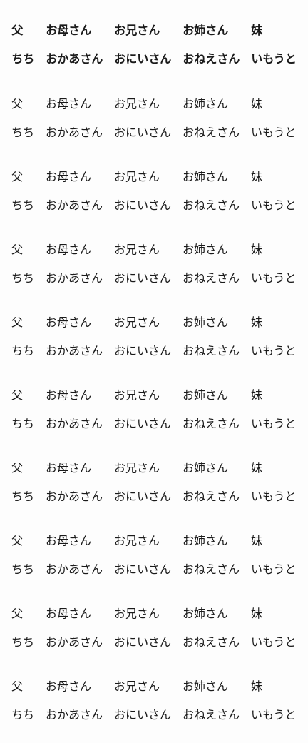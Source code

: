 \documentclass[12pt,a4j, landscape, dvipdfmx]{utarticle}
\def\cell(#1,#2){\rule{0pt}{3ex} \hspace*{-.4cm} {\LARGE #1} \newline \rule{0pt}{4ex} \hspace*{1cm} {\small #2}}
\begin{document}
\newcommand\T{\rule{0pt}{2.6ex}} 


\begin{tabular}{|p{3.5cm} | p{3.5cm} | p{3.5cm} |  p{3.5cm} |  p{3.5cm} |}
\hline 
 \cell(父,ちち) & \cell(お母さん,おかあさん) & \cell(お兄さん,おにいさん) & \cell(お姉さん,おねえさん) & \cell(妹,いもうと) \tabularnewline \hline
 \cell(父,ちち) & \cell(お母さん,おかあさん) & \cell(お兄さん,おにいさん) & \cell(お姉さん,おねえさん) & \cell(妹,いもうと) \tabularnewline \hline
 \cell(父,ちち) & \cell(お母さん,おかあさん) & \cell(お兄さん,おにいさん) & \cell(お姉さん,おねえさん) & \cell(妹,いもうと) \tabularnewline \hline
 \cell(父,ちち) & \cell(お母さん,おかあさん) & \cell(お兄さん,おにいさん) & \cell(お姉さん,おねえさん) & \cell(妹,いもうと) \tabularnewline \hline
 \cell(父,ちち) & \cell(お母さん,おかあさん) & \cell(お兄さん,おにいさん) & \cell(お姉さん,おねえさん) & \cell(妹,いもうと) \tabularnewline \hline
 \cell(父,ちち) & \cell(お母さん,おかあさん) & \cell(お兄さん,おにいさん) & \cell(お姉さん,おねえさん) & \cell(妹,いもうと) \tabularnewline \hline
 \cell(父,ちち) & \cell(お母さん,おかあさん) & \cell(お兄さん,おにいさん) & \cell(お姉さん,おねえさん) & \cell(妹,いもうと) \tabularnewline \hline
 \cell(父,ちち) & \cell(お母さん,おかあさん) & \cell(お兄さん,おにいさん) & \cell(お姉さん,おねえさん) & \cell(妹,いもうと) \tabularnewline \hline
 \cell(父,ちち) & \cell(お母さん,おかあさん) & \cell(お兄さん,おにいさん) & \cell(お姉さん,おねえさん) & \cell(妹,いもうと) \tabularnewline \hline
 \cell(父,ちち) & \cell(お母さん,おかあさん) & \cell(お兄さん,おにいさん) & \cell(お姉さん,おねえさん) & \cell(妹,いもうと) \tabularnewline \hline
\end{tabular} 
\end{document}
